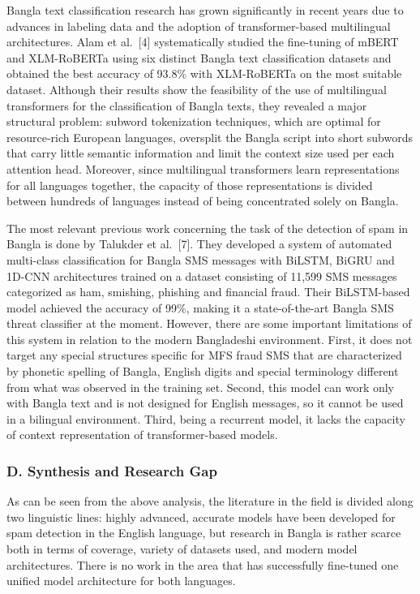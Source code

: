 Bangla text classification research has grown significantly in recent
years due to advances in labeling data and the adoption of
transformer-based multilingual architectures. Alam et al.~{[}4{]}
systematically studied the fine-tuning of mBERT and XLM-RoBERTa using
six distinct Bangla text classification datasets and obtained the best
accuracy of 93.8\% with XLM-RoBERTa on the most suitable dataset.
Although their results show the feasibility of the use of multilingual
transformers for the classification of Bangla texts, they revealed a
major structural problem: subword tokenization techniques, which are
optimal for resource-rich European languages, oversplit the Bangla
script into short subwords that carry little semantic information and
limit the context size used per each attention head. Moreover, since
multilingual transformers learn representations for all languages
together, the capacity of those representations is divided between
hundreds of languages instead of being concentrated solely on Bangla.

The most relevant previous work concerning the task of the detection of
spam in Bangla is done by Talukder et al.~{[}7{]}. They developed a
system of automated multi-class classification for Bangla SMS messages
with BiLSTM, BiGRU and 1D-CNN architectures trained on a dataset
consisting of 11,599 SMS messages categorized as ham, smishing, phishing
and financial fraud. Their BiLSTM-based model achieved the accuracy of
99\%, making it a state-of-the-art Bangla SMS threat classifier at the
moment. However, there are some important limitations of this system in
relation to the modern Bangladeshi environment. First, it does not
target any special structures specific for MFS fraud SMS that are
characterized by phonetic spelling of Bangla, English digits and special
terminology different from what was observed in the training set.
Second, this model can work only with Bangla text and is not designed
for English messages, so it cannot be used in a bilingual environment.
Third, being a recurrent model, it lacks the capacity of context
representation of transformer-based models.

\subsubsection{D. Synthesis and Research
Gap}\label{d.-synthesis-and-research-gap}

As can be seen from the above analysis, the literature in the field is
divided along two linguistic lines: highly advanced, accurate models
have been developed for spam detection in the English language, but
research in Bangla is rather scarce both in terms of coverage, variety
of datasets used, and modern model architectures. There is no work in
the area that has successfully fine-tuned one unified model architecture
for both languages.

